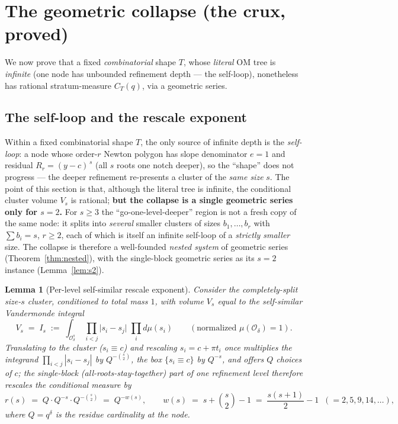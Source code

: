\documentclass[11pt]{article}
\newtheorem{lemma}[theorem]{Lemma}
\theoremstyle{definition}
\theoremstyle{remark}
\newcommand{\Odelta}{\mathcal{O}_\delta}
\begin{document}
\section{The geometric collapse (the crux, proved)}\label{sec:collapse}

We now prove that a fixed \emph{combinatorial} shape $T$, whose \emph{literal} OM
tree is \emph{infinite} (one node has unbounded refinement depth --- the self-loop),
nonetheless has rational stratum-measure $C_T(q)$, via a geometric series.

\subsection{The self-loop and the rescale exponent}

Within a fixed combinatorial shape $T$, the only source of infinite depth is the
\emph{self-loop}: a node whose order-$r$ Newton polygon has slope denominator
$e=1$ and residual $R_r=(y-c)^{\,s}$ (all $s$ roots one notch deeper), so the
``shape'' does not progress --- the deeper refinement re-presents a cluster of the
\emph{same size} $s$. The point of this section is that, although the literal tree
is infinite, the conditional cluster volume $V_s$ is rational; \textbf{but the
collapse is a single geometric series only for $s=2$.} For $s\ge3$ the
``go-one-level-deeper'' region is not a fresh copy of the same node: it splits into
\emph{several} smaller clusters of sizes $b_1,\dots,b_r$ with $\sum b_i=s$,
$r\ge2$, each of which is itself an infinite self-loop of a \emph{strictly smaller}
size. The collapse is therefore a well-founded \emph{nested system} of geometric
series (Theorem~\ref{thm:nested}), with the single-block geometric series as its
$s=2$ instance (Lemma~\ref{lem:s2}).

\begin{lemma}[Per-level self-similar rescale exponent]\label{lem:rescale}
Consider the completely-split size-$s$ cluster, conditioned to total mass $1$, with
volume $V_s$ equal to the self-similar Vandermonde integral
\begin{equation}\label{eq:Idef}
  V_s \;=\; I_s\;:=\;\int_{\Odelta^s}\;\prod_{i<j}\bigl|s_i-s_j\bigr|\;
  \prod_i d\mu(s_i)\qquad(\text{normalized }\mu(\Odelta)=1).
\end{equation}
Translating to the cluster ($s_i\equiv c$) and rescaling $s_i=c+\pi t_i$ once
multiplies the integrand $\prod_{i<j}|s_i-s_j|$ by $Q^{-\binom s2}$, the box
$\{s_i\equiv c\}$ by $Q^{-s}$, and offers $Q$ choices of $c$; the \emph{single-block}
(all-roots-stay-together) part of one refinement level therefore rescales the
conditional measure by
\begin{equation}\label{eq:rfactor}
  r(s)\;=\;Q\cdot Q^{-s}\cdot Q^{-\binom s2}\;=\;Q^{-w(s)},\qquad
  w(s)\;=\;s+\binom s2-1\;=\;\frac{s(s+1)}{2}-1
  \;\;(=2,5,9,14,\dots),
\end{equation}
where $Q=q^\delta$ is the residue cardinality at the node.
\end{lemma}
\end{document}
